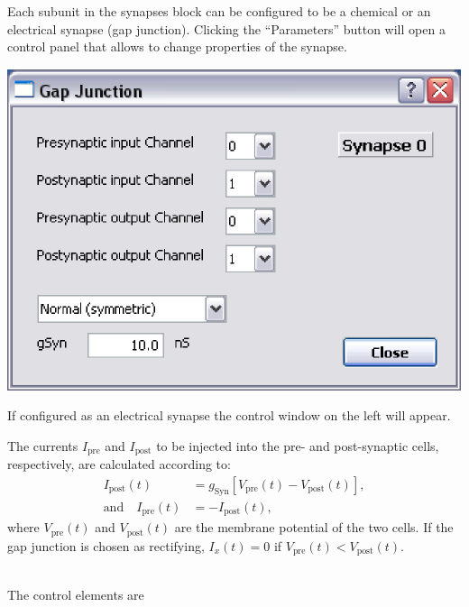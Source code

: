 \documentclass{article}
\begin{document}
Each subunit in the synapses block can be configured to be a
chemical or an electrical synapse (gap junction). Clicking the
``Parameters'' button will open a control panel that allows to change
properties of the synapse. \\

\noindent
\parbox{0.4\textwidth}{
\includegraphics[scale=0.5]{gapJunctionDialog}
}
\hfill
\parbox{0.55\textwidth}{
If configured as an electrical synapse the control window on the left
will appear. 

The currents $I_{\text{pre}}$ and $I_{\text{post}}$ to be injected
into the pre- and post-synaptic cells, respectively, are calculated
according to:
\begin{align}
  I_{\text{post}}(t) &= g_{\text{Syn}} [V_{\text{pre}}(t) - V_{\text{post}}(t)],  \\
  \text{and} \quad I_{\text{pre}}(t) &= -I_{\text{post}}(t), 
\end{align}
where $V_{\text{pre}}(t)$ and $V_{\text{post}}(t)$ are the membrane
potential of the two cells. If the gap junction is chosen as
rectifying, $I_x (t)= 0$ if $V_{\text{pre}}(t) < V_{\text{post}}(t)$.
} \\[0.2cm]
 The control elements are
\end{document}
